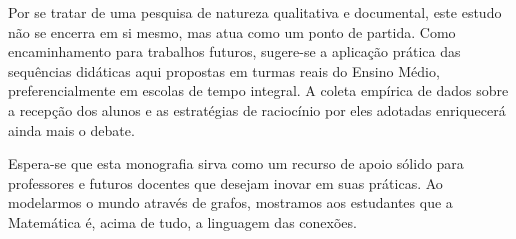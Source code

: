 \documentclass[
  12pt,
  oneside,
  a4paper,
  english,
  brazilian
  ]{abntex2}
\theoremstyle{definition}
\begin{document}
Por se tratar de uma pesquisa de natureza qualitativa e documental, este estudo não se encerra em si mesmo, mas atua como um ponto de partida. Como encaminhamento para trabalhos futuros, sugere-se a aplicação prática das sequências didáticas aqui propostas em turmas reais do Ensino Médio, preferencialmente em escolas de tempo integral. A coleta empírica de dados sobre a recepção dos alunos e as estratégias de raciocínio por eles adotadas enriquecerá ainda mais o debate.

Espera-se que esta monografia sirva como um recurso de apoio sólido para professores e futuros docentes que desejam inovar em suas práticas. Ao modelarmos o mundo através de grafos, mostramos aos estudantes que a Matemática é, acima de tudo, a linguagem das conexões.

\postextual

\printbibliography
\end{document}
